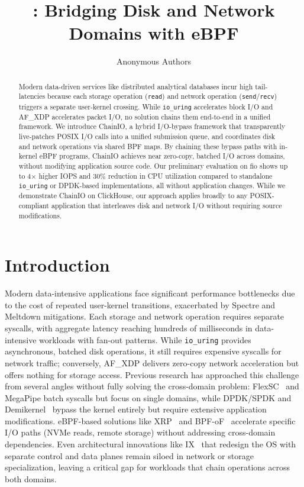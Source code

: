 \documentclass[sigconf,10pt]{acmart}
\title{\sys: Bridging Disk and Network Domains with eBPF}
\author{
Anonymous Authors
}
\newcommand{\sys}{ChainIO\xspace}
\begin{document}
\begin{abstract}
Modern data-driven services like distributed analytical databases incur high tail-latencies because each storage operation (\texttt{read}) and network operation (\texttt{send}/\texttt{recv}) triggers a separate user-kernel crossing. While \texttt{io\_uring} accelerates block I/O and AF\_XDP accelerates packet I/O, no solution chains them end-to-end in a unified framework. We introduce \sys, a hybrid I/O-bypass framework that transparently live-patches POSIX I/O calls into a unified submission queue, and coordinates disk and network operations via shared BPF maps. By chaining these bypass paths with in-kernel eBPF programs, \sys achieves near zero-copy, batched I/O across domains, without modifying application source code. Our preliminary evaluation on fio shows up to 4× higher IOPS and 30\% reduction in CPU utilization compared to standalone \texttt{io\_uring} or DPDK-based implementations, all without application changes. While we demonstrate \sys on ClickHouse, our approach applies broadly to any POSIX-compliant application that interleaves disk and network I/O without requiring source modifications.
\end{abstract}

\maketitle

\section{Introduction}

Modern data-intensive applications face significant performance bottlenecks due to the cost of repeated user-kernel transitions, exacerbated by Spectre and Meltdown mitigations. Each storage and network operation requires separate syscalls, with aggregate latency reaching hundreds of milliseconds in data-intensive workloads with fan-out patterns. While \texttt{io\_uring}\cite{iouring} provides asynchronous, batched disk operations, it still requires expensive syscalls for network traffic; conversely, AF\_XDP\cite{afxdp} delivers zero-copy network acceleration but offers nothing for storage access. Previous research has approached this challenge from several angles without fully solving the cross-domain problem: FlexSC~\cite{flexsc} and MegaPipe batch syscalls but focus on single domains, while DPDK/SPDK and Demikernel~\cite{zhang2021demikernel} bypass the kernel entirely but require extensive application modifications. eBPF-based solutions like XRP~\cite{Zhong22} and BPF-oF~\cite{zarkadas2023bpf} accelerate specific I/O paths (NVMe reads, remote storage) without addressing cross-domain dependencies. Even architectural innovations like IX~\cite{ix} that redesign the OS with separate control and data planes remain siloed in network or storage specialization, leaving a critical gap for workloads that chain operations across both domains.
\end{document}
